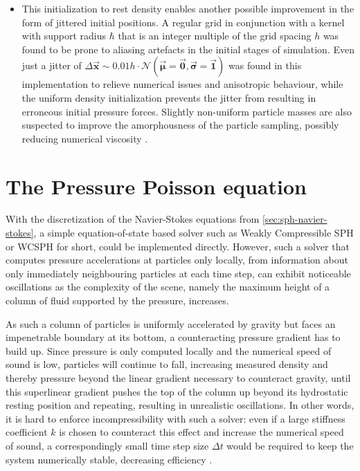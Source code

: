 \documentclass[oneside, a4paper]{book}
\newcommand\vek[1]{\vec{\bm{#1}}}
\newcommand\br[1]{\left(#1\right)}
\begin{document}
\begin{itemize}
      \item This initialization to rest density enables another possible improvement in the form of jittered initial positions. A regular grid in conjunction with a kernel with support radius $\hbar$ that is an integer multiple of the grid spacing $h$ was found to be prone to aliasing artefacts in the initial stages of simulation. Even just a jitter of $\Delta \vek{x} \sim 0.01h\cdot\mathcal{N}\br{\vek{\mu}=\vek{0}, \vek{\sigma}=\vek{1}}$ was found in this implementation to relieve numerical issues and anisotropic behaviour, while the uniform density initialization prevents the jitter from resulting in erroneous initial pressure forces. Slightly non-uniform particle masses are also suspected to improve the amorphousness of the particle sampling, possibly reducing numerical viscosity \autocite{labcourse}.
    \end{itemize}
   

    \section{The Pressure Poisson equation}\label{sec:ppe}
    With the discretization of the Navier-Stokes equations from \autoref{sec:sph-navier-stokes}, a simple equation-of-state based solver such as Weakly Compressible SPH or WCSPH for short, could be implemented directly. However, such a solver that computes pressure accelerations at particles only locally, from information about only immediately neighbouring particles at each time step, can exhibit noticeable oscillations as the complexity of the scene, namely the maximum height of a column of fluid supported by the pressure, increases.

    As such a column of particles is uniformly accelerated by gravity but faces an impenetrable boundary at its bottom, a counteracting pressure gradient has to build up. Since pressure is only computed locally and the numerical speed of sound is low, particles will continue to fall, increasing measured density and thereby pressure beyond the linear gradient necessary to counteract gravity, until this superlinear gradient pushes the top of the column up beyond its hydrostatic resting position and repeating, resulting in unrealistic oscillations. In other words, it is hard to enforce incompressibility with such a solver: even if a large stiffness coefficient $k$ is chosen to counteract this effect and increase the numerical speed of sound, a correspondingly small time step size $\Delta t$ would be required to keep the system numerically stable, decreasing efficiency \autocite{iisph}. 
    
\end{document}
